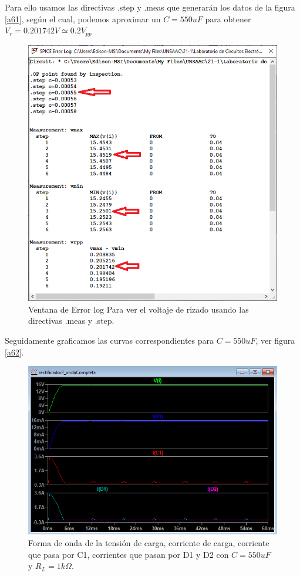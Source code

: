 \documentclass[a4paper]{IEEEtran} %
\begin{document}
Para ello usamos las directivas .step y .meas que generarán los datos de la figura \eqref{a61}, según el cual, podemos aproximar un $C=550uF$ para obtener $V_r = 0.201742V \simeq 0.2V_{pp}$

\begin{figure}[h!]
	\centering
	\includegraphics[scale=0.5]{IMAGENES/a61}
	\caption{Ventana de Error log Para ver el voltaje de rizado usando las directivas .meas y .step.}
	\label{a61}
\end{figure}

Seguidamente graficamos las curvas correspondientes para $C=550uF$, ver figura \eqref{a62}.

\begin{figure}[!h]
	\centering
	\includegraphics[scale=0.5]{IMAGENES/a62}
	\caption{Forma de onda de la tensión de carga, corriente de carga, corriente que pasa por C1, corrientes que pasan por D1 y D2 con $C = 550uF$ y $R_L = 1k\Omega$.}
	\label{a62}
\end{figure}
\end{document}
